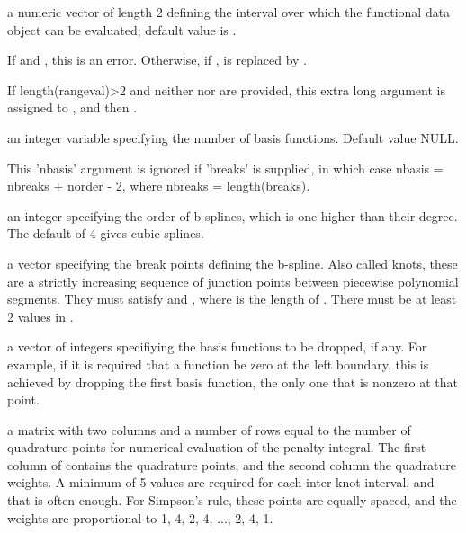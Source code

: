 \documentclass{article}
\begin{document}
\begin{Arguments}
\begin{ldescription}
\item[\code{rangeval}] a numeric vector of length 2 defining the interval over which the
functional data object can be evaluated;  default value is
.

If  and , this is an
error.  Otherwise, if , 
is replaced by .

If length(rangeval)>2 and neither  nor 
are provided, this extra long  argument is assigned
to , and then .

\item[\code{nbasis}] an integer variable specifying the number of basis functions.
Default value NULL.

This 'nbasis' argument is ignored if 'breaks' is supplied, in which
case nbasis = nbreaks + norder - 2, where nbreaks = length(breaks).

\item[\code{norder}] an integer specifying the order of b-splines, which is one higher
than their degree. The default of 4 gives cubic splines.

\item[\code{breaks}] a vector specifying the break points defining the b-spline.
Also called knots, these are a strictly increasing sequence
of junction points between piecewise polynomial segments.
They must satisfy  and
, where  is the
length of .  There must be at least 2 values in
.

\item[\code{dropind}] a vector of integers specifiying the basis functions to
be dropped, if any.  For example, if it is required that
a function be zero at the left boundary, this is achieved
by dropping the first basis function, the only one that
is nonzero at that point.

\item[\code{quadvals}] a matrix with two columns and a number of rows equal to the number
of quadrature points for numerical evaluation of the penalty
integral.  The first column of  contains the
quadrature points, and the second column the quadrature weights.  A
minimum of 5 values are required for each inter-knot interval, and
that is often enough.  For Simpson's rule, these points are equally
spaced, and the weights are proportional to 1, 4, 2, 4, ..., 2, 4,
1.


\end{ldescription}
\end{Arguments}
\end{document}

